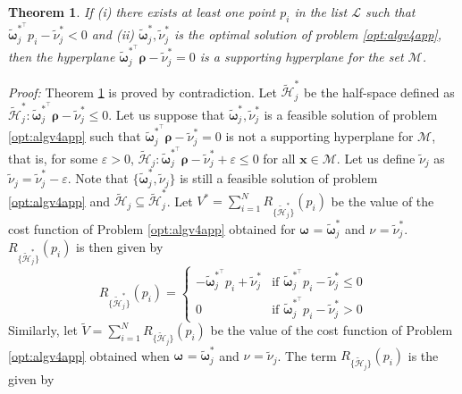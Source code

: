 \documentclass[twocolumn]{autart}
\newtheorem{theorem}{Theorem}
\newenvironment*{proof}{\emph{Proof:}}{}
\newcommand{\xhyp}{\mathbf{\rho}}
\begin{document}
\begin{theorem} \label{pr:supphype}
If (i) there exists at least one point $p_i$ in the list $\mathcal{L}$ such that $\tilde{\boldsymbol{\omega}}_j^{*^\top} p_i-\tilde{\nu}^*_j < 0$ and (ii) $\tilde{\boldsymbol{\omega}}^*_j,\tilde{\nu}^*_j$ is the optimal solution of problem \eqref{opt:algv4app}, then the hyperplane $\tilde{\boldsymbol{\omega}}_j^{*^\top} \xhyp-\tilde{\nu}^*_j  = 0$ is a supporting hyperplane for the set $\mathcal{M}$.
\end{theorem}
\begin{proof}
Theorem \ref{pr:supphype} is proved by contradiction.  Let  $\tilde{\mathcal{H}}_j^*$ be the half-space defined   as  $\tilde{\mathcal{H}}_j^*: \tilde{\boldsymbol{\omega}}_j^{*^\top} \xhyp-\tilde{\nu}^*_j \leq 0$. Let us suppose that $\tilde{\boldsymbol{\omega}}^*_j,\tilde{\nu}^*_j$ is a feasible solution of problem \eqref{opt:algv4app} such that $\tilde{\boldsymbol{\omega}}_j^{*^\top} \xhyp-\tilde{\nu}^*_j = 0$ is not a supporting hyperplane for $\mathcal{M}$, that is, for some $\varepsilon > 0$,  $\tilde{\mathcal{H}}_j:\tilde{\boldsymbol{\omega}}_j^{*^\top} \xhyp-\tilde{\nu}^*_j+ \varepsilon \leq 0$ for all $\mathbf{x} \in \mathcal{M}$. Let us define $\tilde{\nu}_j$ as $\tilde{\nu}_j=\tilde{\nu}^*_j- \varepsilon$. Note that $\{\tilde{\boldsymbol{\omega}}^*_j,\tilde{\nu}_j\}$ is still a feasible solution of problem \eqref{opt:algv4app} and $\mathcal{\tilde{H}}_j \subseteq \tilde{\mathcal{H}}_j^*$. Let $ V^*=\sum_{i=1}^N R_{\{\tilde{\mathcal{H}}_j^*\}}(p_i)$ be the value of the cost function of Problem \eqref{opt:algv4app} obtained for $\boldsymbol{\omega}^{}=\tilde{\boldsymbol{\omega}}^*_j$ and $\nu^{}=\tilde{\nu}^*_j$.  $R_{\{\tilde{\mathcal{H}}_j^*\}}(p_i)$ is then  given by
\begin{equation}
R_{\{\tilde{\mathcal{H}}_j^*\}}(p_i) =\left\{\!\begin{array}{ll}
                                    -\tilde{\boldsymbol{\omega}}_j^{*^\top} p_i+\tilde{\nu}^*_j & \mbox{if } \tilde{\boldsymbol{\omega}}_j^{*^\top} p_i-\tilde{\nu}^*_j \leq 0\\
                                    0 & \mbox{if } \tilde{\boldsymbol{\omega}}_j^{*^\top} p_i-\tilde{\nu}^*_j > 0
                                    \end{array}
\right.
\end{equation}
Similarly, let $ \tilde{V}=\sum_{i=1}^N R_{\{\mathcal{\tilde{H}}_j\}}(p_i)$ be the value of the cost function of Problem \eqref{opt:algv4app} obtained when $\boldsymbol{\omega}^{}=\tilde{\boldsymbol{\omega}}^*_j$ and $\nu^{}=\tilde{\nu}_j$. The term $R_{\{\mathcal{\tilde{H}}_j\}}(p_i)$ is the given by

\end{proof}
\end{document}
